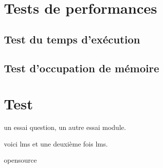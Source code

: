 \documentclass{polytech/polytech}
\begin{document}
        \section{Tests de performances}
            \subsection{Test du temps d'exécution}
            \subsection{Test d'occupation de mémoire}
        
        \section{Test}
        
            un essai \gls{question}, un autre essai \gls{module}.
            
            voici \gls{lms} et une deuxième fois \gls{lms}.
            
            \gls{opensource}
    
    
    
\end{document}
